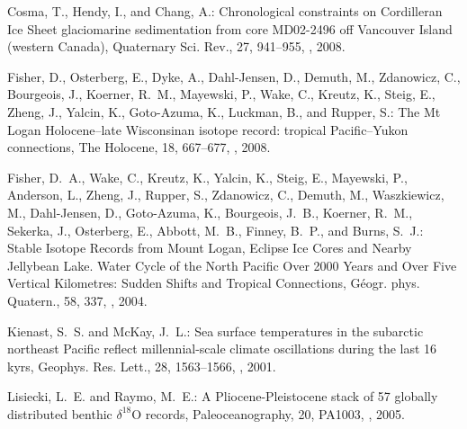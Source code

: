 \begin{thebibliography}{69}

Cosma, T., Hendy, I., and Chang, A.: Chronological constraints on Cordilleran
  Ice Sheet glaciomarine sedimentation from core MD02-2496 off Vancouver Island
  (western Canada), Quaternary Sci. Rev., 27, 941--955,
  , 2008.

Fisher, D., Osterberg, E., Dyke, A., Dahl-Jensen, D., Demuth, M., Zdanowicz,
  C., Bourgeois, J., Koerner, R.~M., Mayewski, P., Wake, C., Kreutz, K., Steig,
  E., Zheng, J., Yalcin, K., Goto-Azuma, K., Luckman, B., and Rupper, S.: The
  Mt Logan Holocene--late Wisconsinan isotope record: tropical Pacific--Yukon
  connections, The Holocene, 18, 667--677, ,
  2008.

Fisher, D.~A., Wake, C., Kreutz, K., Yalcin, K., Steig, E., Mayewski, P.,
  Anderson, L., Zheng, J., Rupper, S., Zdanowicz, C., Demuth, M., Waszkiewicz,
  M., Dahl-Jensen, D., Goto-Azuma, K., Bourgeois, J.~B., Koerner, R.~M.,
  Sekerka, J., Osterberg, E., Abbott, M.~B., Finney, B.~P., and Burns, S.~J.:
  Stable Isotope Records from Mount Logan, Eclipse Ice Cores and Nearby
  Jellybean Lake. Water Cycle of the North Pacific Over 2000 Years and Over
  Five Vertical Kilometres: Sudden Shifts and Tropical Connections, G\'{e}ogr.
  phys. Quatern., 58, 337, , 2004.

Kienast, S.~S. and McKay, J.~L.: Sea surface temperatures in the subarctic
  northeast Pacific reflect millennial-scale climate oscillations during the
  last 16 kyrs, Geophys. Res. Lett., 28, 1563--1566,
  , 2001.

Lisiecki, L.~E. and Raymo, M.~E.: A Pliocene-Pleistocene stack of 57 globally
  distributed benthic $\delta^{18}$O records, Paleoceanography, 20, PA1003,
  , 2005.


\end{thebibliography}
